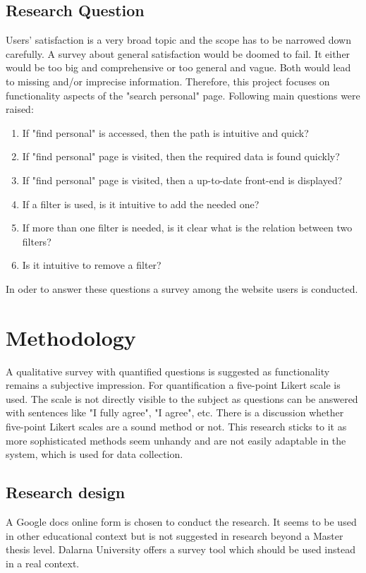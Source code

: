 \documentclass[12pt,a4paper,paper=a4,oneside,titlepage,pdftex]{scrartcl}
\begin{document}
\subsection{Research Question}
Users' satisfaction is a very broad topic and the scope has to be narrowed down carefully. A survey about general satisfaction would be doomed to fail. It either would be too big and comprehensive or too general and vague. Both would lead to missing and/or imprecise information. Therefore, this project focuses on functionality aspects of the "search personal" page. Following main questions were raised:
\begin{enumerate}
	\item If "find personal" is accessed, then the path is intuitive and quick?
	\item If "find personal" page is visited, then the required data is found quickly?
	\item If "find personal" page is visited, then a up-to-date front-end is displayed?
	\item If a filter is used, is it intuitive to add the needed one?
	\item If more than one filter is needed, is it clear what is the relation between two filters?
	\item Is it intuitive to remove a filter?
\end{enumerate}

In oder to answer these questions a survey among the website users is conducted.

\section{Methodology}
A qualitative survey \cite{sofaer1999qualitative} with quantified questions is suggested as functionality remains a subjective impression. For quantification a five-point Likert scale \cite{likert1932technique} is used. The scale is not directly visible to the subject as questions can be answered with sentences like "I fully agree", "I agree", etc. There is a discussion \cite{cummins2000we} whether five-point Likert scales are a sound method or not. This research sticks to it as more sophisticated methods \cite{chimi2009likert} seem unhandy and are not easily adaptable in the system, which is used for data collection.

\subsection{Research design}
A Google docs online form is chosen to conduct the research. It seems to be used in other educational context \cite{gehringer2010daily} but is not suggested in research beyond a Master thesis level. Dalarna University offers a survey tool which should be used instead in a real context.
\end{document}

